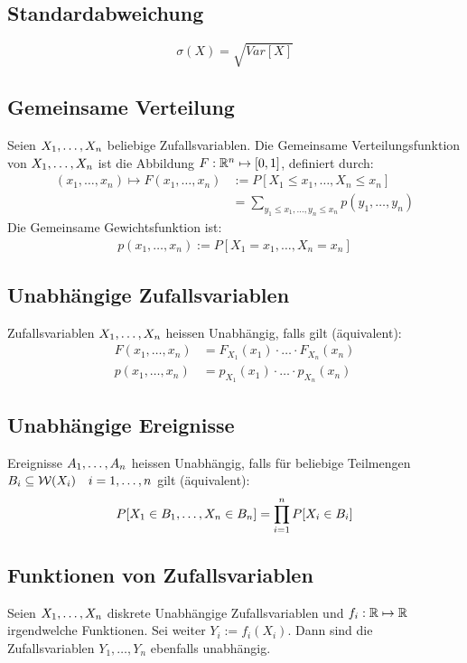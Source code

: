 \subsection*{Standardabweichung}
\[
  \sigma (X) = \sqrt{Var[X]}
\]
\subsection*{Gemeinsame Verteilung}
Seien $X_1, \dots, X_n$ beliebige Zufallsvariablen. Die Gemeinsame
Verteilungsfunktion von $X_1, \dots, X_n$ ist die Abbildung $F: \mathbb{R}^n \mapsto
  [0, 1]$, definiert durch:
\begin{align*}
  (x_1, \dots, x_n) \mapsto F (x_1, \dots, x_n) & := P[X_1 \leq x_1, \dots, X_n \leq x_n]                        \\
                                                & = \sum_{y_1 \leq x_1, \dots, y_n \leq x_n} p (y_1, \dots, y_n)
\end{align*}
Die Gemeinsame Gewichtsfunktion ist:
\begin{align*}
  p (x_1, \dots, x_n) := P[X_1 = x_1, \dots, X_n = x_n]
\end{align*}

\subsection*{Unabhängige Zufallsvariablen}
Zufallsvariablen $X_1, \dots, X_n$ heissen Unabhängig, falls gilt
(äquivalent):
\begin{align*}
  F (x_1, \dots, x_n) & = F_{X_1} (x_1) \cdot \hdots \cdot F_{X_n} (x_n) \\
  p (x_1, \dots, x_n) & = p_{X_1} (x_1) \cdot \hdots \cdot p_{X_n} (x_n)
\end{align*}
\subsection*{Unabhängige Ereignisse}
Ereignisse $A_1, \dots, A_n$ heissen Unabhängig, falls für beliebige Teilmengen
$B_i \subseteq \mathcal{W} (X_i) \quad i = 1, \dots, n$ gilt (äquivalent):
\begin{align*}
  P[X_1 \in B_1, \dots, X_n \in B_n] = \prod_{i = 1}^n P[X_i \in B_i]
\end{align*}
\subsection*{Funktionen von Zufallsvariablen}
Seien $X_1, \dots, X_n$ diskrete Unabhängige Zufallsvariablen und $f_i: \mathbb{R}
  \mapsto \mathbb{R}$ irgendwelche Funktionen. Sei weiter $Y_i := f_i (X_i)$. Dann sind
die Zufallsvariablen $Y_1, \dots, Y_n$ ebenfalls unabhängig.
